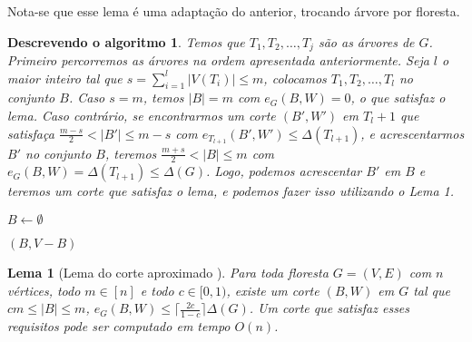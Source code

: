 \documentclass[a4paper,12pt]{article}
\newtheorem{lem}{Lema}
\newtheorem{alg}{Descrevendo o algoritmo}
\begin{document}
\medskip

Nota-se que esse lema é uma adaptação do anterior, trocando árvore
por floresta.

\medskip

\begin{alg}
	Temos que $T_1, T_2, \ldots,T_j $ são 
	as árvores de $G$. 
	Primeiro percorremos as árvores na ordem apresentada 
	anteriormente. Seja $l$ o maior inteiro tal que 
	$s = \displaystyle\sum_{i=1}^{l}|V(T_i)| \le m$,
	colocamos $T_1,T_2, \ldots,T_l$ no conjunto $B$.
	Caso $s=m$, temos $|B|=m$ com  $e_G(B,W)=0$, o que satisfaz o lema.
	Caso contrário, se encontrarmos um corte $(B',W')$ em $T_l+1$ que
	satisfaça $\frac{m-s}{2}<|B'|\le m-s$ com $e_{T_{l+1}}(B',W') \le 
	\Delta(T_{l+1})$, e acrescentarmos $B'$ no conjunto
	$B$, teremos
	$\frac{m+s}{2}<|B| \le m$ com 
	$e_G(B,W) = \Delta(T_{l+1}) \le \Delta(G)$.
	Logo, podemos acrescentar $B'$ em $B$ e teremos um corte
	que satisfaz o lema, e podemos fazer isso utilizando o Lema 1.

\end{alg}

\begin{algorithm}[H]

	\caption{Computa corte aproximado simples}
	$B \gets \emptyset$\;

	\Return $(B,V-B)$\;

\end{algorithm}	

\bigskip
\bigskip
\bigskip
\bigskip
\bigskip
\bigskip
\bigskip
\bigskip


\begin{lem}[Lema do corte aproximado {\cite[Lemma 3]{Schmidt15}}]

	Para toda floresta $G=(V,E)$ com $n$ vértices, todo $m \in [n]$
	e todo $c \in [0,1)$,
	existe um corte $(B,W)$ em $G$ tal que 
	$cm \le |B| \le m$,
	$e_G(B,W) \le \lceil \frac{2c}{1-c}\rceil \Delta(G)$.
	Um corte que satisfaz esses requisitos pode ser computado em
	tempo $O(n)$.
\end{lem}
\end{document}
